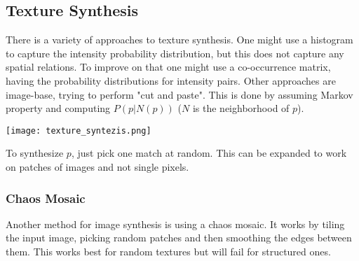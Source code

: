 \subsection{Texture Synthesis}

There is a variety of approaches to texture synthesis. One might use a histogram to capture the intensity probability distribution, but this does not capture any spatial relations. To improve on that one might use a co-occurrence matrix, having the probability distributions for intensity pairs. Other approaches are image-base, trying to perform "cut and paste". This is done by assuming Markov property and computing $P(p | N(p))$ ($N$ is the neighborhood of $p$).
\begin{center}
	\texttt{[image: texture\_syntezis.png]}
\end{center}

To synthesize $p$, just pick one match at random. This can be expanded to work on patches of images and not single pixels.

\subsubsection{Chaos Mosaic}

Another method for image synthesis is using a chaos mosaic. It works by tiling the input image, picking random patches and then smoothing the edges between them. This works best for random textures but will fail for structured ones.
